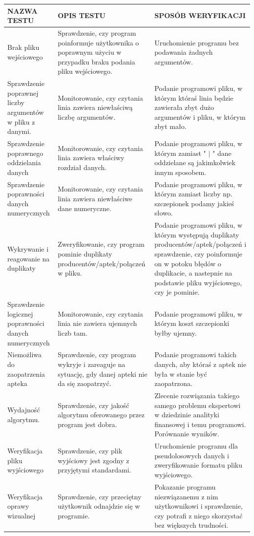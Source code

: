 \documentclass[a4paper]{article}
\begin{document}
\begin{tabularx}{1.0\textwidth} { 
  | >{\centering\arraybackslash}X 
  | >{\centering\arraybackslash}X 
  | >{\centering\arraybackslash}X | } \hline
\textbf{NAZWA TESTU} & \textbf{OPIS TESTU} & \textbf{SPOSÓB WERYFIKACJI}\\ \hline
Brak pliku wejściowego & Sprawdzenie, czy program poinformuje użytkownika o poprawnym użyciu w przypadku braku podania pliku wejściowego. & Uruchomienie programu bez podawania żadnych argumentów.\\ \hline 
Sprawdzenie poprawnej liczby argumentów w pliku z danymi. & Monitorowanie, czy czytania linia zawiera niewłaściwą liczbę argumentów. & Podanie programowi pliku, w którym któraś linia będzie zawierała zbyt dużo argumentów i pliku, w którym zbyt mało.\\	\hline 
Sprawdzenie poprawnego oddzielania danych & Monitorowanie, czy czytania linia zawiera właściwy rozdział danych. & Podanie programowi pliku, w którym zamiast " $|$ " dane oddzielane są jakimkolwiek innym sposobem. \\ \hline
Sprawdzenie poprawności danych numerycznych & Monitorowanie, czy czytania linia zawiera niewłaściwe dane numeryczne. & Podanie programowi pliku, w którym zamiast liczby np. szczepionek podamy jakieś słowo. \\ \hline
Wykrywanie i reagowanie na duplikaty & Zweryfikowanie, czy program pominie duplikaty producentów/aptek/połączeń w pliku. & Podanie programowi pliku, w którym występują duplikaty producentów/aptek/połączeń i sprawdzenie, czy poinformuje on w potoku błędów o duplikacie, a nastepnie na podstawie pliku wyjściowego, czy je pominie. \\ \hline  
Sprawdzenie logicznej poprawności danych numerycznych & Monitorowanie, czy czytania linia nie zawiera ujemnych liczb tam. & Podanie programowi pliku, w którym koszt szczepionki byłby ujemny. \\ \hline
Niemożliwa do zaopatrzenia apteka & Sprawdzenie, czy program wykryje i zareaguje na sytuację, gdy danej apteki nie da się zaopatrzyć. & Podanie programowi takich danych, aby któraś z aptek nie była w stanie być zaopatrzona. \\ \hline
Wydajność algorytmu. & Sprawdzenie, czy jakość algorytmu oferowanego przez program jest dobra. & Zlecenie rozwiązania takiego samego problemu ekspertowi w dziedzinie analityki finansowej i temu programowi. Porównanie wyników. \\ \hline
Weryfikacja pliku wyjściowego & Sprawdzenie, czy plik wyjściowy jest zgodny z przyjętymi standardami. & Uruchomienie programu dla pseudolosowych danych i zweryfikowanie formatu pliku wyjściowego. \\ \hline
Weryfikacja oprawy wizualnej & Sprawdzenie, czy przeciętny użytkownik odnajdzie się w programie. & Pokazanie programu niezwiązanemu z nim użytkownikowi i sprawdzenie, czy potrafi z niego skorzystać bez większych trudności. \\ \hline
\end{tabularx}
\end{document}
